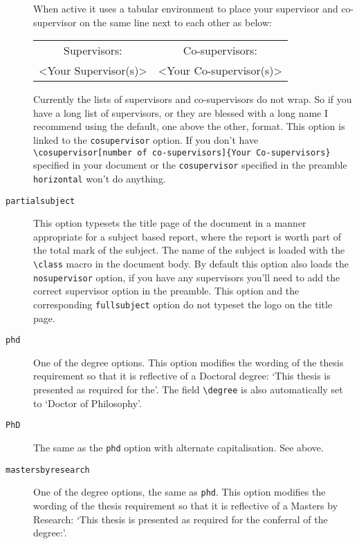 \documentclass[12pt,oneside]{article}
\newcommand{\option}[1]{\texttt{\color{Green}#1}} %
\newcommand{\command}[1]{\texttt{\color{Red}#1}} %
\newcommand{\comoptions}[1]{\texttt{\color{Blue}#1}} %
\begin{document}
\begin{description}
    When active it uses a tabular environment to place your supervisor and co-supervisor on the same line next to each other as below:
    \begin{center}
    \begin{tabular}{cc} 
        Supervisors: & Co-supervisors:\\
        \textless{}Your Supervisor(s)\textgreater & \textless{}Your Co-supervisor(s)\textgreater\\
    \end{tabular}
    \end{center}
    
    Currently the lists of supervisors and co-supervisors do not wrap. So if you have a long list of supervisors, or they are blessed with a long name I recommend using the default, one above the other, format. This option is linked to the \option{cosupervisor} option. If you don't have \command{\textbackslash{}cosupervisor}\option{[number of co-supervisors]}\comoptions{\{Your Co-supervisors\}} specified in your document or the \option{cosupervisor} specified in the preamble \option{horizontal} won't do anything.
    
    \item[\option{partialsubject}]
    This option typesets the title page of the document in a manner appropriate for a subject based report, where the report is worth part of the total mark of the subject. The name of the subject is loaded with the \command{\textbackslash{}class} macro in the document body. By default this option also loads the \option{nosupervisor} option, if you have any supervisors you'll need to add the correct supervisor option in the preamble. This option and the corresponding \option{fullsubject} option do not typeset the logo on the title page.
    
    \item[\option{phd}]
    One of the degree options. This option modifies the wording of the thesis requirement so that it is reflective of a Doctoral degree: `This thesis is presented as required for the'. The field \command{\textbackslash{}degree} is also automatically set to `Doctor of Philosophy'.

    \item[\option{PhD}]
    The same as the \option{phd} option with alternate capitalisation. See above.
        
    \item[\option{mastersbyresearch}]
    One of the degree options, the same as \option{phd}. This option modifies the wording of the thesis requirement so that it is reflective of a Masters by Research: `This thesis is presented as required for the conferral of the degree:'.
    

\end{description}
\end{document}
